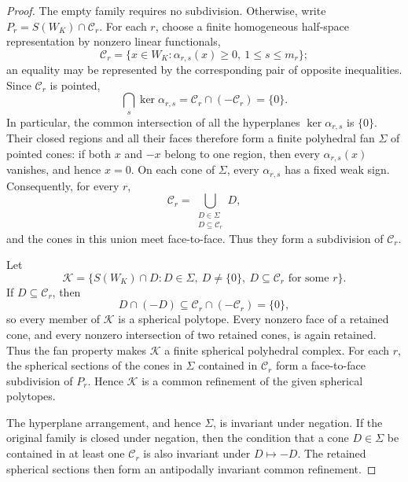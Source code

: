 \documentclass[reqno,12pt]{amsart}
\theoremstyle{definition}
\begin{document}
\begin{proof}
The empty family requires no subdivision.  Otherwise, write
\(P_r=S(W_K)\cap\mathcal C_r\).  For each \(r\), choose a finite homogeneous
half-space representation by nonzero linear functionals,
\[
 \mathcal C_r=\{x\in W_K:\alpha_{r,s}(x)\geq0,\ 1\leq s\leq m_r\};
\]
an equality may be represented by the corresponding pair of opposite
inequalities.  Since \(\mathcal C_r\) is pointed,
\[
 \bigcap_s\ker\alpha_{r,s}
 =\mathcal C_r\cap(-\mathcal C_r)=\{0\}.
\]
In particular, the common intersection of all the hyperplanes
\(\ker\alpha_{r,s}\) is \(\{0\}\).  Their closed regions and all their
faces therefore form a finite polyhedral fan \(\Sigma\) of pointed
cones: if both \(x\) and \(-x\) belong to one region, then every
\(\alpha_{r,s}(x)\) vanishes, and hence \(x=0\).  On each cone of
\(\Sigma\), every
\(\alpha_{r,s}\) has a fixed weak sign.  Consequently, for every \(r\),
\[
 \mathcal C_r
 =\bigcup_{\substack{D\in\Sigma\\D\subseteq\mathcal C_r}}D,
\]
and the cones in this union meet face-to-face.  Thus they form a
subdivision of \(\mathcal C_r\).

Let
\[
 \mathcal K=
 \{S(W_K)\cap D:D\in\Sigma,\ D\ne\{0\},\
                    D\subseteq\mathcal C_r\text{ for some }r\}.
\]
If \(D\subseteq\mathcal C_r\), then
\[
 D\cap(-D)\subseteq
 \mathcal C_r\cap(-\mathcal C_r)=\{0\},
\]
so every member of \(\mathcal K\) is a spherical polytope.  Every
nonzero face of a retained cone, and every nonzero intersection of two
retained cones, is again retained.  Thus the fan property makes
\(\mathcal K\) a finite spherical polyhedral complex.  For each \(r\),
the spherical sections of the cones in \(\Sigma\) contained in
\(\mathcal C_r\)
form a face-to-face subdivision of \(P_r\).  Hence \(\mathcal K\) is a
common refinement of the given spherical polytopes.

The hyperplane arrangement, and hence \(\Sigma\), is invariant under
negation.  If the original family is closed under negation, then the
condition that a cone \(D\in\Sigma\) be contained in at least one
\(\mathcal C_r\) is also invariant under \(D\mapsto-D\).  The retained
spherical sections then form an antipodally invariant common
refinement.
\end{proof}
\end{document}
